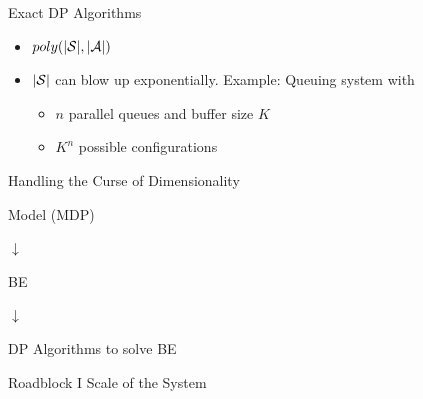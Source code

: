 \documentclass[10pt]{beamer}
\begin{document}
\begin{frame}[fragile]{Exact DP Algorithms }

\begin{algorithm}[H]
\caption*{Template of Exact DP Algorithm}
\begin{algorithmic}[1]
\STATE{{\color{orange}{Value/Policy-Iteration, Linear Programming}}}
\STATE{\}}
\end{algorithmic}
\end{algorithm}

\begin{itemize}
\item $poly(|\S|,|\A|)$
\item $|\S|$ can blow up exponentially. Example: Queuing system with
    \begin{itemize}
    \item $n$ parallel queues and buffer size $K$
    \item $K^n$ possible configurations
    \end{itemize}
\end{itemize}
\end{frame}



\begin{frame}[fragile]{Handling the Curse of Dimensionality}

\begin{block}{}
\centering    Model (MDP)
\end{block}
\centering $\downarrow$
\begin{block}{}
\centering BE
\end{block}
\centering $\downarrow$
\begin{block}{}
\centering DP Algorithms to solve BE
\end{block}
\begin{block}{\centering Roadblock I}
\centering Scale of the System
\end{block}

{\color{orange}{Approximate Dynamic Programming} }

\end{frame}
\end{document}
